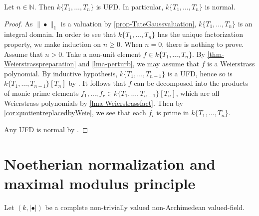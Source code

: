 \begin{proposition}\label{prop-Tatealgufd}
    Let $n\in \mathbb{N}$. Then $k\{T_1,\ldots,T_n\}$ is UFD. In particular, $k\{T_1,\ldots,T_n\}$ is normal.
\end{proposition}
\begin{proof}
    As $\|\bullet\|_1$ is a valuation by \cref{prop-TateGaussvaluation}, $k\{T_1,\ldots,T_n\}$ is an integral domain. In order to see that $k\{T_1,\ldots,T_n\}$ has the unique factorization property, we make induction on $n\geq 0$. When $n=0$, there is nothing to prove. Assume that $n>0$. Take a non-unit element $f\in k\{T_1,\ldots,T_n\}$. By \cref{thm-Weierstrasspreparation} and \cref{lma-perturb}, we may assume that $f$ is a Weierstrass polynomial. By inductive hypothesis, $k\{T_1,\ldots,T_{n-1}\}$ is a UFD, hence so is $k\{T_1,\ldots,T_{n-1}\}[T_n]$ by \cite[\href{https://stacks.math.columbia.edu/tag/0BC1}{Tag 0BC1}]{stacks-project}. It follows that $f$ can be decomposed into the products of monic prime elements $f_1,\ldots,f_r\in k\{T_1,\ldots,T_{n-1}\}[T_n]$, which are all Weierstrass polynomials by \cref{lma-Weierstrassfact}. Then by \cref{cor:quotientreplacedbyWeie}, we see that each $f_i$ is prime in $k\{T_1,\ldots,T_{n}\}$.

    Any UFD is normal by \cite[\href{https://stacks.math.columbia.edu/tag/0AFV}{Tag 0AFV}]{stacks-project}.
\end{proof}



\section{Noetherian normalization and maximal modulus principle}
Let $(k,|\bullet|)$ be a complete non-trivially valued non-Archimedean valued-field. 

